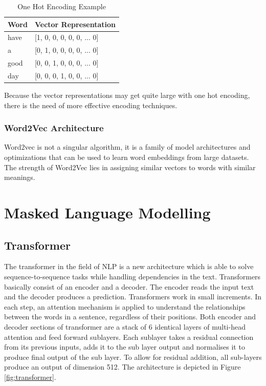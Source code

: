 \begin{table}[H]
	\centering
	\begin{tabular}{ll}
		\hline
		\textbf{Word} & \textbf{Vector Representation} \\ \hline
		have & [1, 0, 0, 0, 0, 0, ... 0]\\ 
		a    & [0, 1, 0, 0, 0, 0, ... 0]\\ 
		good & [0, 0, 1, 0, 0, 0, ... 0]\\ 
		day  & [0, 0, 0, 1, 0, 0, ... 0]\\ \hline
	\end{tabular}
	\caption{One Hot Encoding Example}
	\label{tab:onehot}
\end{table}

Because the vector representations may get quite large with one hot encoding, there is the need of more effective encoding techniques.

\subsubsection{Word2Vec Architecture}
Word2vec is not a singular algorithm, it is a family of model architectures and optimizations that can be used to learn word embeddings from large datasets. The strength of Word2Vec lies in assigning similar vectors to words with similar meanings. 






\section{Masked Language Modelling}

\subsection{Transformer}
The transformer in the field of NLP is a new architecture which is able to solve sequence-to-sequence tasks while handling dependencies in the text. Transformers basically consist of an encoder and a decoder. The encoder reads the input text and the decoder produces a prediction. Transformers work in small increments. In each step, an attention mechanism is applied to understand the relationships between the words in a sentence, regardless of their positions. Both encoder and decoder sections of transformer are a stack of 6 identical layers of multi-head attention and feed forward sublayers. \alert{Each sublayer takes a residual connection from its previous inputs, adds it to the sub layer output and normalises it to produce final output of the sub layer. To allow for residual addition, all sub-layers produce an output of dimension 512.} The architecture is depicted in Figure \ref{fig:transformer}.


